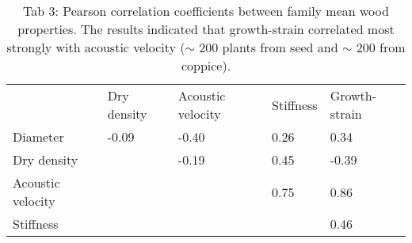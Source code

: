 \begin{table}
\centering
\caption{Tab 3: Pearson correlation coefficients between family mean wood properties. The results indicated that growth-strain correlated most strongly with acoustic velocity (\(\sim\) 200 plants from seed and \(\sim\) 200 from coppice).}
\label{my-label}
\begin{tabular}{lllll}
                  & Dry density       & Acoustic velocity & Stiffness & Growth-strain        \\
Diameter          & -0.09             & -0.40     & 0.26          & 0.34  \\
Dry density       &                   & -0.19     & 0.45          & -0.39 \\
Acoustic velocity &                   &           & 0.75          & 0.86  \\
Stiffness         &                   &           &               & 0.46 
\end{tabular}
\end{table}